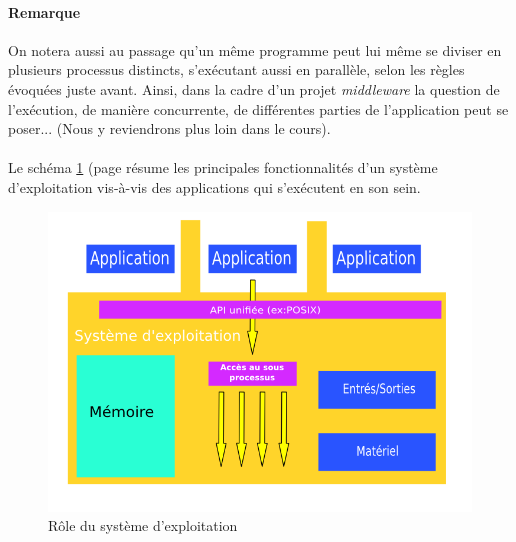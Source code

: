 {    \paragraph{Remarque} On notera aussi au passage qu'un même programme peut lui même se diviser en
    plusieurs processus distincts, s'exécutant aussi en parallèle, selon les règles évoquées juste
    avant. Ainsi, dans la cadre d'un projet \textit{middleware} la question de l'exécution, de
    manière concurrente, de différentes parties de l'application peut se poser... (Nous y
    reviendrons plus loin dans le cours).

    \paragraph{} Le schéma \ref{role-os} (page \pageref{role-os} résume les principales
    fonctionnalités d'un système d'exploitation vis-à-vis des applications qui s'exécutent en son
    sein.

    \begin{figure}[h]
      \begin{center}
        \includegraphics[scale=0.3]{img/operating-system.png}
        \caption{Rôle du système d'exploitation}
        \label{role-os}
      \end{center}
    \end{figure}
}

